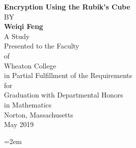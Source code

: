 \documentclass[
    letterpaper,
    oneside,
    12pt
]{book}
\begin{document}
\begin{titlepage}
    \thispagestyle{empty}\doublespacing\centering
    \LARGE \textbf{Encryption Using the Rubik's Cube} \\
    \large BY \\
    \textbf{Weiqi Feng} \\
    \vspace{15mm}
    A Study \\
    Presented to the Faculty \\
    of \\
    Wheaton College \\
    in Partial Fulfillment of the Requirements \\
    for \\
    Graduation with Departmental Honors \\
    in Mathematics \\
    Norton, Massachusetts \\
    May 2019
\end{titlepage}
\pagebreak
\frontmatter{}


\tableofcontents{}
\mainmatter{}






\backmatter{}
\emergencystretch=2em
\printbibliography[heading=bibintoc]

\end{document}
